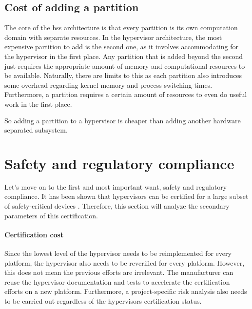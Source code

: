 \subsection{Cost of adding a partition}
The core of the \acrshort{hss} architecture is that every partition is its own computation domain with separate resources. In the hypervisor architecture, the most expensive partition to add is the second one, as it involves accommodating for the hypervisor in the first place. Any partition that is added beyond the second just requires the appropriate amount of memory and computational resources to be available. Naturally, there are limits to this as each partition also introduces some overhead regarding kernel memory and process switching times.  Furthermore, a partition requires a certain amount of resources to even do useful work in the first place.

So adding a partition to a hypervisor is cheaper than adding another hardware separated subsystem.

\section{Safety and regulatory compliance \label{safety-analysis}}
 Let's move on to the first and most important want, safety and regulatory compliance. It has been shown that hypervisors can be certified for a large subset of safety-critical devices \cite{larrucea2015modular}. Therefore, this section will analyze the secondary parameters of this certification.

\paragraph{Certification cost}

Since the lowest level of the hypervisor needs to be reimplemented for every platform, the hypervisor also needs to be reverified for every platform. However, this does not mean the previous efforts are irrelevant. The manufacturer can reuse the hypervisor documentation and tests to accelerate the certification efforts on a new platform.
Furthermore, a project-specific risk analysis also needs to be carried out regardless of the hypervisors certification status.

